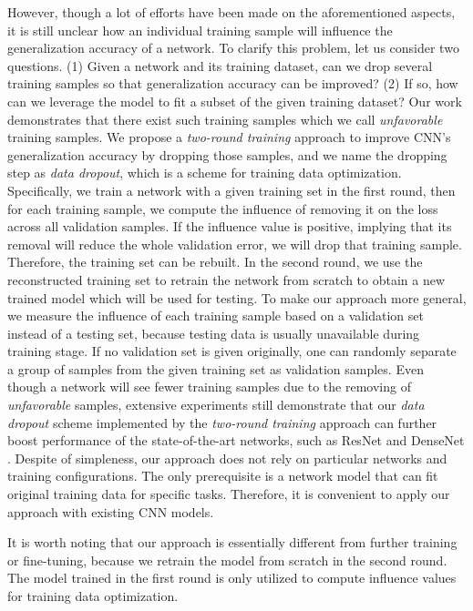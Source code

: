 \documentclass[10pt, conference, letterpaper]{IEEEtran}
\begin{document}
However, though a lot of efforts have been made on the aforementioned aspects, it is still unclear how an individual training sample will influence the generalization accuracy of a network. To clarify this problem, let us consider two questions. (1) Given a network and its training dataset, can we drop several training samples so that generalization accuracy can be improved? (2) If so, how can we leverage the model to fit a subset of the given training dataset? Our work demonstrates that there exist such training samples which we call \emph{unfavorable} training samples. We propose a \emph{two-round training} approach to improve CNN's generalization accuracy by dropping those samples, and we name the dropping step as \emph{data dropout}, which is a scheme for training data optimization. Specifically, we train a network with a given training set in the first round, then for each training sample, we compute the influence of removing it on the loss across all validation samples. If the influence value is positive, implying that its removal will reduce the whole validation error, we will drop that training sample. Therefore, the training set can be rebuilt. In the second round, we use the reconstructed training set to retrain the network from scratch to obtain a new trained model which will be used for testing. To make our approach more general, we measure the influence of each training sample based on a validation set instead of a testing set, because testing data is usually unavailable during training stage. If no validation set is given originally, one can randomly separate a group of samples from the given training set as validation samples. Even though a network will see fewer training samples due to the removing of \emph{unfavorable} samples, extensive experiments still demonstrate that our \emph{data dropout} scheme implemented by the \emph{two-round training} approach can further boost performance of the state-of-the-art networks, such as ResNet \cite{he2016deep} and DenseNet \cite{huang2017densely}. Despite of simpleness, our approach does not rely on particular networks and training configurations. The only prerequisite is a network model that can fit original training data for specific tasks. Therefore, it is convenient to apply our approach with existing CNN models.

It is worth noting that our approach is essentially different from further training or fine-tuning, because we retrain the model from scratch in the second round. The model trained in the first round is only utilized to compute influence values for training data optimization. 
\end{document}
